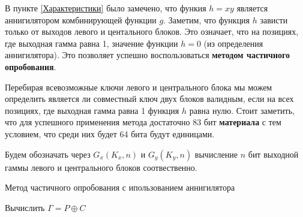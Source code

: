 \documentclass[a4paper,12pt]{article}
\theoremstyle{definition}
\begin{document}
	В пункте \ref{Характеристики} было замечено, что функия $h=x y$ является аннигилятором комбинирующей функции $g$. Заметим, что функция $h$ зависти только от выходов левого и центального блоков. Это означает, что на позициях, где выходная гамма равна 1, значение функции $h=0$ (из определения аннигилятора). Это позволяет успешно воспользоваться \textbf{методом частичного опробования}.
	
	Перебирая всевозможные ключи левого и центрального блока мы можем определить является ли совместный ключ двух блоков валидным, если на всех позициях, где выходная гамма равна 1 функция $h$ равна нулю. Стоит заметить, что для успешного применения метода достаточно 83 бит \textbf{материала} с тем условием, что среди них будет 64 бита будут единицами.
	
	Будем обозначать через $G_x(K_x, n)$ и $G_y(K_y, n)$ вычисление $n$ бит выходной гаммы левого и центрального блоков соотвественно.
	
	
	\begin{algorithm}[H]
		
		\caption{Метод частичного опробования с ипользованием аннигилятора}
		\label{alg:Annig}
		\SetAlgoNoEnd
		
		
		Вычислить $\Gamma = P \oplus C $ 
		
	\end{algorithm}	
\end{document}
